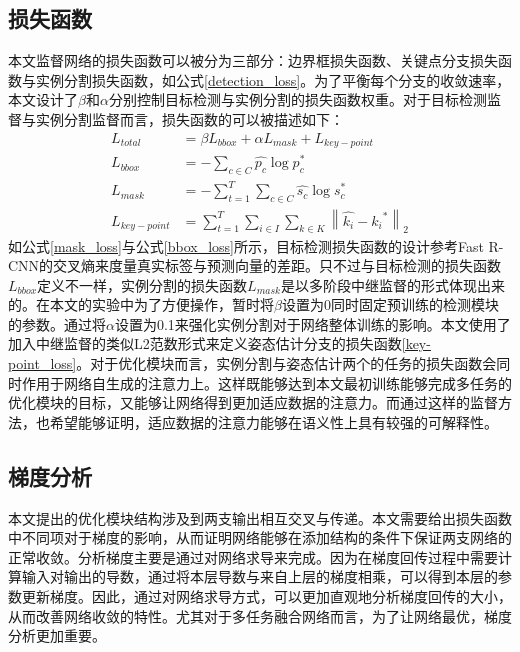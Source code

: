 \subsection{损失函数}
\label{subsec:lossfunction}

本文监督网络的损失函数可以被分为三部分：边界框损失函数、关键点分支损失函数与实例分割损失函数，如公式\eqref{detection_loss}。为了平衡每个分支的收敛速率，本文设计了$\beta$和$\alpha$分别控制目标检测与实例分割的损失函数权重。对于目标检测监督与实例分割监督而言，损失函数的可以被描述如下：
\begin{align}
L_{total} &= \beta L_{bbox} + \alpha L_{mask} + L_{key-point}\label{detection_loss}\\
L_{bbox} &= -\sum_{c \in C}{\hat{p_c} \log{p_c^{*}}}\label{bbox_loss}\\
L_{mask} &= -\sum_{t=1}^{T}\sum_{c \in C}{\hat{s_c} \log{s_c^{*}}}\label{mask_loss}\\
L_{key-point} &= \sum_{t=1}^{T}\sum_{i \in I}\sum_{k \in K}{\left\| \hat{k_i} - {k_i}^{*} \right\|_2}\label{key-point_loss}
\end{align}
如公式\eqref{mask_loss}与公式\eqref{bbox_loss}所示，目标检测损失函数的设计参考Fast R-CNN\cite{Girshick2015Fast}的交叉熵来度量真实标签与预测向量的差距。只不过与目标检测的损失函数$L_{bbox}$定义不一样，实例分割的损失函数$L_{mask}$是以多阶段中继监督的形式体现出来的。在本文的实验中为了方便操作，暂时将$\beta$设置为0同时固定预训练的检测模块的参数。通过将$\alpha$设置为0.1来强化实例分割对于网络整体训练的影响。本文使用了加入中继监督的类似L2范数形式来定义姿态估计分支的损失函数\eqref{key-point_loss}。对于优化模块而言，实例分割与姿态估计两个的任务的损失函数会同时作用于网络自生成的注意力上。这样既能够达到本文最初训练能够完成多任务的优化模块的目标，又能够让网络得到更加适应数据的注意力。而通过这样的监督方法，也希望能够证明，适应数据的注意力能够在语义性上具有较强的可解释性。



\subsection{梯度分析}
\label{subsec:gradient}
本文提出的优化模块结构涉及到两支输出相互交叉与传递。本文需要给出损失函数中不同项对于梯度的影响，从而证明网络能够在添加结构的条件下保证两支网络的正常收敛。分析梯度主要是通过对网络求导来完成。因为在梯度回传过程中需要计算输入对输出的导数，通过将本层导数与来自上层的梯度相乘，可以得到本层的参数更新梯度。因此，通过对网络求导方式，可以更加直观地分析梯度回传的大小，从而改善网络收敛的特性。尤其对于多任务融合网络而言，为了让网络最优，梯度分析更加重要。

